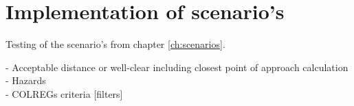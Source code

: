 \chapter{Implementation of scenario's}
Testing of the scenario's from chapter \ref{ch:scenarios}.

- Acceptable distance or well-clear including closest point of approach calculation\\
- Hazards\\
- COLREGs criteria [filters]\\